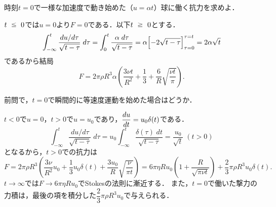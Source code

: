 
\begin{mondai}{}{}
時刻$t=0$で一様な加速度で動き始めた（$u=\alpha t$）球に働く抗力を求めよ．
\end{mondai}
\begin{kaitou}
$t \ika 0$では$u=0$より$F=0$である．以下$t \ijou 0$とする．
\[
    \int_{-\infty}^{t} \frac{du/d\tau}{\sqrt{t-\tau}} \; d\tau = \int_{0}^{t} \frac{\alpha \; d\tau}{\sqrt{t-\tau}}
    = \alpha \Bigl[ -2\sqrt{t-\tau} \Bigr]_{\tau=0}^{\tau=t} = 2\alpha\sqrt{t}
\]
であるから結局
\[
    F = 2\pi\rho R^3 \alpha \left( \frac{3\nu t}{R^2} + \frac{1}{3} + \frac{6}{R} \sqrt{\frac{\nu t}{\pi}} \right).
\]

\end{kaitou}





\begin{mondai}{}{}
前問で，$t=0$で瞬間的に等速度運動を始めた場合はどうか．  
\end{mondai}
\begin{kaitou}
$t < 0$で$u=0$，$t > 0$で$u=u_0$であり，$\ddv{u}{t} = u_0 \delta(t)$である．
\[
    \int_{-\infty}^{t} \frac{du/d\tau}{\sqrt{t-\tau}} \; d\tau = u_0 \int_{-\infty}^{t} \frac{\delta(\tau) \; dt}{\sqrt{t-\tau}}
    = \frac{u_0}{\sqrt{t}} \; (t>0)
\]
となるから，$t>0$での抗力は
\[
    F = 2\pi\rho R^3 \left( \frac{3\nu}{R^2} u_0 + \frac{1}{3}u_0 \delta(t) + \frac{3u_0}{R} \sqrt{\frac{\nu}{\pi t}} \right)
    = 6\pi\eta R u_0 \left( 1 + \frac{R}{\sqrt{\pi\nu t}} \right) + \frac{2}{3}\pi\rho R^3 u_0 \delta(t).
\]
$t\to\infty$では$F \to 6\pi\eta R u_0$でStokesの法則に漸近する．
また，$t=0$で働いた撃力の力積は，最後の項を積分した$\dfrac{2}{3}\pi\rho R^3 u_0$で与えられる．

\end{kaitou}






